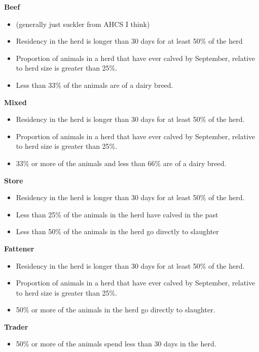 \documentclass[
  letterpaper,
  DIV=11,
  numbers=noendperiod]{scrreprt}
\providecommand{\tightlist}{%
  \setlength{\itemsep}{0pt}\setlength{\parskip}{0pt}}
\begin{document}
\textbf{Beef}

\begin{itemize}
\tightlist
\item
  (generally just suckler from AHCS I think)
\item
  Residency in the herd is longer than 30 days for at least 50\% of the
  herd
\item
  Proportion of animals in a herd that have ever calved by September,
  relative to herd size is greater than 25\%.
\item
  Less than 33\% of the animals are of a dairy breed.
\end{itemize}

\textbf{Mixed}

\begin{itemize}
\tightlist
\item
  Residency in the herd is longer than 30 days for at least 50\% of the
  herd.
\item
  Proportion of animals in a herd that have ever calved by September,
  relative to herd size is greater than 25\%.
\item
  33\% or more of the animals and less than 66\% are of a dairy breed.
\end{itemize}

\textbf{Store}

\begin{itemize}
\tightlist
\item
  Residency in the herd is longer than 30 days for at least 50\% of the
  herd.
\item
  Less than 25\% of the animals in the herd have calved in the past
\item
  Less than 50\% of the animals in the herd go directly to slaughter
\end{itemize}

\textbf{Fattener}

\begin{itemize}
\tightlist
\item
  Residency in the herd is longer than 30 days for at least 50\% of the
  herd.
\item
  Proportion of animals in a herd that have ever calved by September,
  relative to herd size is greater than 25\%.
\item
  50\% or more of the animals in the herd go directly to slaughter.
\end{itemize}

\textbf{Trader}

\begin{itemize}
\tightlist
\item
  50\% or more of the animals spend less than 30 days in the herd.
\end{itemize}
\end{document}
